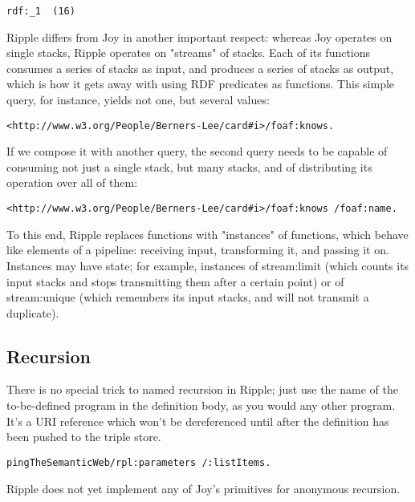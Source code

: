 \documentclass[runningheads]{llncs}
\begin{document}
\begin{verbatim}
rdf:_1  (16)
\end{verbatim}







Ripple differs from Joy in another important respect: whereas Joy operates on single stacks, Ripple operates on "streams" of stacks.  Each of its functions consumes a series of stacks as input, and produces a series of stacks as output, which is how it gets away with using RDF predicates as functions.  This simple query, for instance, yields not one, but several values:

\begin{verbatim}
<http://www.w3.org/People/Berners-Lee/card#i>/foaf:knows.
\end{verbatim}

If we compose it with another query, the second query needs to be capable of consuming not just a single stack, but many stacks, and of distributing its operation over all of them:

\begin{verbatim}
<http://www.w3.org/People/Berners-Lee/card#i>/foaf:knows /foaf:name.
\end{verbatim}

To this end, Ripple replaces functions with "instances" of functions, which behave like elements of a pipeline: receiving input, transforming it, and passing it on.  Instances may have state; for example, instances of stream:limit (which counts its input stacks and stops transmitting them after a certain point) or of stream:unique (which remembers its input stacks, and will not transmit a duplicate).



\subsection{Recursion}

There is no special trick to named recursion in Ripple; just use the name of the to-be-defined program in the definition body, as you would any other program.  It's a URI reference which won't be dereferenced until after the definition has been pushed to the triple store.


\begin{verbatim}
pingTheSemanticWeb/rpl:parameters /:listItems.
\end{verbatim}

Ripple does not yet implement any of Joy's primitives for anonymous recursion.
\end{document}
